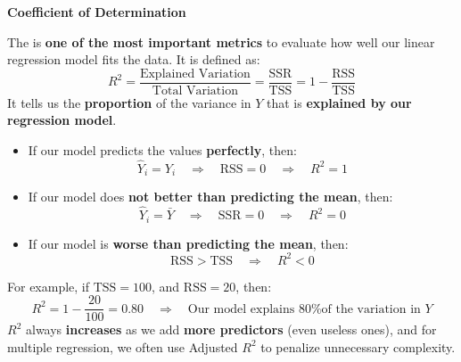 \newpage

\begin{flushleft}
    \textcolor{Green3}{ \textbf{Coefficient of Determination}}
\end{flushleft}
The  is \textbf{one of the most important metrics} to evaluate how well our linear regression model fits the data. It is defined as:
\begin{equation}\label{eq: coefficient of determination}
    R^{2} = \dfrac{
        \text{Explained Variation}
    }{
        \text{Total Variation}
    } =
    \dfrac{\text{SSR}}{\text{TSS}} =
    1 - \dfrac{\text{RSS}}{\text{TSS}}
\end{equation}
It tells us the \textbf{proportion} of the variance in $Y$ that is \textbf{explained by our regression model}.
\begin{itemize}
    \item[\textcolor{Green3}{\faIcon{check-circle}}] If our model predicts the values \textbf{perfectly}, then:
    \begin{equation*}
        \hat{Y}_i = Y_i \quad \Rightarrow \quad \text{RSS} = 0 \quad \Rightarrow \quad R^{2} = 1
    \end{equation*}

    \item[\textcolor{Orange3}{\faIcon{balance-scale}}] If our model does \textbf{not better than predicting the mean}, then:
    \begin{equation*}
        \hat{Y}_i = \bar{Y} \quad \Rightarrow \quad \text{SSR} = 0 \quad \Rightarrow \quad R^{2} = 0
    \end{equation*}

    \item[\textcolor{Red2}{\faIcon{times-circle}}] If our model is \textbf{worse than predicting the mean}, then:
    \begin{equation*}
        \text{RSS} > \text{TSS} \quad \Rightarrow \quad R^{2} < 0
    \end{equation*}
\end{itemize}
For example, if $\text{TSS} = 100$, and $\text{RSS} = 20$, then:
\begin{equation*}
    R^{2} = 1 - \dfrac{20}{100} = 0.80 \quad \Rightarrow \quad \text{Our model explains 80\% of the variation in } Y
\end{equation*}
$R^{2}$ always \textbf{increases} as we add \textbf{more predictors} (even useless ones), and for multiple regression, we often use Adjusted $R^{2}$ to penalize unnecessary complexity.

